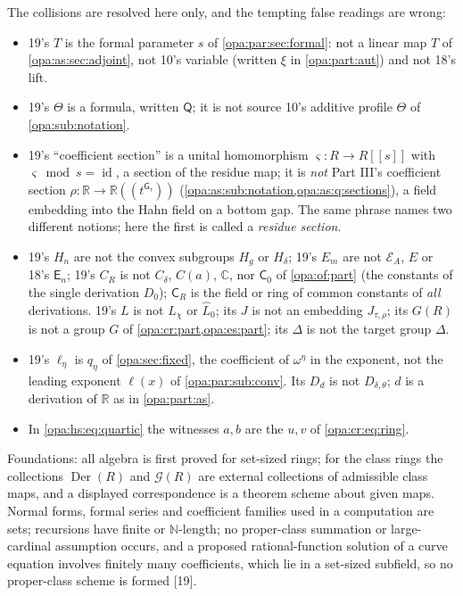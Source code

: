 \documentclass[11pt,oneside]{article}
\numberwithin{equation}{section}
\theoremstyle{definition}
\theoremstyle{remark}
\newcommand{\R}{\mathbb R}
\newcommand{\C}{\mathbb C}
\newcommand{\N}{\mathbb N}
\newcommand{\EE}{\mathcal E}
\newcommand{\id}{\operatorname{id}}
\newcommand{\Hahn}[2]{#1((t^{#2}))}
\newcommand{\src}[1]{\textup{\textsf{\small[#1]}}}
\newcommand{\gap}{\mathsf G}
\newcommand{\Der}{\operatorname{Der}}
\begin{document}
The collisions are resolved here only, and the tempting false readings are wrong:
\begin{itemize}[itemsep=1pt]
\item 19's $T$ is the formal parameter $s$ of \cref{opa:par:sec:formal}: not a linear map $T$ of \cref{opa:as:sec:adjoint}, not 10's
variable (written $\xi$ in \cref{opa:part:aut}) and not 18's lift.
\item 19's $\Theta$ is a formula, written $\mathsf Q$; it is not source 10's additive profile $\Theta$ of \cref{opa:sub:notation}.
\item 19's ``coefficient section'' is a unital homomorphism $\varsigma:R\to R[[s]]$ with $\varsigma\bmod s=\id$, a section of the residue map;
it is \emph{not} Part III's coefficient section $\rho:\R\to\Hahn\R{\gap_\tau}$ (\cref{opa:as:sub:notation,opa:as:q:sections}), a field
embedding into the Hahn field on a bottom gap. The same phrase names two different notions; here the first is called a \emph{residue
section}.
\item 19's $H_n$ are not the convex subgroups $H_g$ or $H_\delta$; 19's $E_m$ are not $\EE_A$, $E$ or 18's $\mathsf E_n$; 19's $C_R$ is not
$C_\delta$, $C(a)$, $\C$, nor $\mathsf C_0$ of \cref{opa:of:part} (the constants of the single derivation $D_0$); $\mathsf C_R$ is the field or
ring of common constants of \emph{all} derivations. 19's $L$ is not $L_\chi$ or $\widehat L_0$; its $J$ is not an embedding $J_{\tau,\rho}$; its
$G(R)$ is not a group $G$ of \cref{opa:cr:part,opa:es:part}; its $\Delta$ is not the target group $\Delta$.
\item 19's $\ell_\eta$ is $q_\eta$ of \cref{opa:sec:fixed}, the coefficient of $\omega^\eta$ in the exponent, not the leading exponent $\ell(x)$ of
\cref{opa:par:sub:conv}. Its $D_d$ is not $D_{\delta,\theta}$; $d$ is a derivation of $\R$ as in \cref{opa:part:as}.
\item In \eqref{opa:hs:eq:quartic} the witnesses $a,b$ are the $u,v$ of \eqref{opa:cr:eq:ring}.
\end{itemize}
Foundations: all algebra is first proved for set-sized rings; for the class rings the collections $\Der(R)$ and $\mathcal G(R)$ are
external collections of admissible class maps, and a displayed correspondence is a theorem scheme about given maps. Normal forms, formal
series and coefficient families used in a computation are sets; recursions have finite or $\N$-length; no proper-class summation or
large-cardinal assumption occurs, and a proposed rational-function solution of a curve equation involves finitely many coefficients,
which lie in a set-sized subfield, so no proper-class scheme is formed \src{19}.
\end{document}
